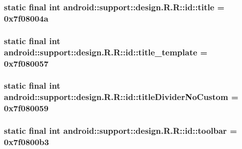 \hypertarget{classandroid_1_1support_1_1design_1_1_r_1_1id_f05c0c718b9d3b1a4c07cbeab2fc9f01}{
\subsubsection[{title}]{\setlength{\rightskip}{0pt plus 5cm}static final int android::support::design.R.R::id::title = 0x7f08004a}}
\label{classandroid_1_1support_1_1design_1_1_r_1_1id_f05c0c718b9d3b1a4c07cbeab2fc9f01}


\hypertarget{classandroid_1_1support_1_1design_1_1_r_1_1id_d456b39271700d5271de0ae11886b536}{
\subsubsection[{title\_\-template}]{\setlength{\rightskip}{0pt plus 5cm}static final int android::support::design.R.R::id::title\_\-template = 0x7f080057}}
\label{classandroid_1_1support_1_1design_1_1_r_1_1id_d456b39271700d5271de0ae11886b536}


\hypertarget{classandroid_1_1support_1_1design_1_1_r_1_1id_90a10b252b8eada8efe2c2863564321d}{
\subsubsection[{titleDividerNoCustom}]{\setlength{\rightskip}{0pt plus 5cm}static final int android::support::design.R.R::id::titleDividerNoCustom = 0x7f080059}}
\label{classandroid_1_1support_1_1design_1_1_r_1_1id_90a10b252b8eada8efe2c2863564321d}


\hypertarget{classandroid_1_1support_1_1design_1_1_r_1_1id_5a9298a5efee30413c3f6281f8f238ad}{
\subsubsection[{toolbar}]{\setlength{\rightskip}{0pt plus 5cm}static final int android::support::design.R.R::id::toolbar = 0x7f0800b3}}
\label{classandroid_1_1support_1_1design_1_1_r_1_1id_5a9298a5efee30413c3f6281f8f238ad}


